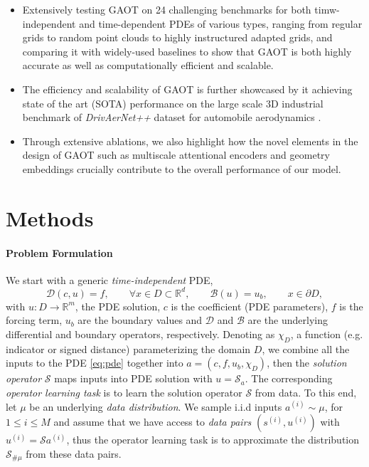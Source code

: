 \documentclass[reqno,10pt]{amsart}
\theoremstyle{plain}
\theoremstyle{definition}
\newcommand{\bb}[1]{\mathbb{#1}}
\newcommand{\cal}[1]{\mathcal{#1}}
\begin{document}
\begin{itemize}\setlength{\itemsep}{0.7em}
    \item Extensively testing GAOT on 24 challenging benchmarks for both timw-independent and time-dependent PDEs of various types, ranging from regular grids to random point clouds to highly instructured adapted grids, and comparing it with widely-used baselines to show that GAOT is both highly accurate as well as computationally efficient and scalable.
    \item The efficiency and scalability of GAOT is further showcased by it achieving state of the art (SOTA) performance on the large scale 3D industrial benchmark of {\it DrivAerNet++} dataset for automobile aerodynamics \cite{ME2025}.
    \item Through extensive ablations, we also highlight how the novel elements in the design of GAOT such as multiscale attentional encoders and geometry embeddings crucially contribute to the overall performance of our model.
\end{itemize}

\section{\bf Methods}
\paragraph{\bf Problem Formulation} We start with a generic {\it time-independent} PDE,
\begin{equation}\label{eq:pde}
    \cal D(c,u) = f, \qquad \forall x  \in D\subset \bb R^d, \qquad \cal B(u) = u_b, \qquad x\in \partial D,
\end{equation}
with $u: D \to \bb R^m$, the PDE solution, $c$ is the coefficient (PDE parameters), $f$ is the forcing term, $u_b$ are the boundary values and $\cal D$ and $\cal B$ are the underlying differential and boundary operators, respectively. Denoting as $\chi_D$, a function (e.g. indicator or signed distance) parameterizing the domain $D$, we combine all the inputs to the PDE \ref{eq:pde} together into $a = (c,f,u_b,\chi_D)$, then the {\it solution operator} $\cal{S}$ maps inputs into PDE solution with $u = \cal S_a$. The corresponding {\it operator learning task} is to learn the solution operator $\cal S$ from data. To this end, let $\mu$ be an underlying {\it data distribution}. We sample i.i.d inputs $a^{(i)} \sim\mu$, for $1 \leq i \leq M$ and assume that we have access to {\it data pairs} $(s^{(i)}, u^{(i)})$ with $u^{(i)} = \cal Sa^{(i)}$, thus the operator learning task is to approximate the distribution $\cal S_{\#\mu}$ from these data pairs. 
\end{document}
